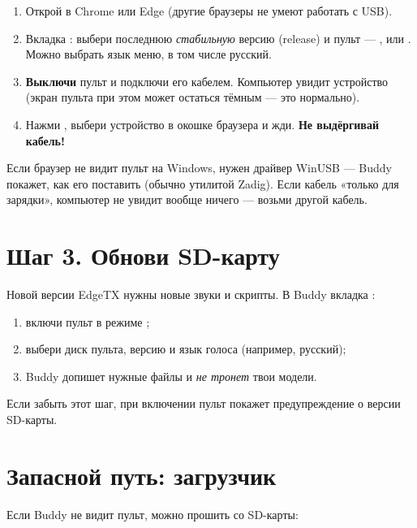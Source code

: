 \begin{enumerate}
  \item Открой  в Chrome или Edge (другие браузеры не умеют работать с USB).
  \item Вкладка : выбери последнюю \emph{стабильную} версию (release) и пульт ---
        ,  или .
        Можно выбрать язык меню, в том числе русский.
  \item \textbf{Выключи} пульт и подключи его кабелем. Компьютер увидит устройство
         (экран пульта при этом может остаться тёмным --- это нормально).
  \item Нажми , выбери устройство в окошке браузера и жди. \textbf{Не выдёргивай кабель!}
\end{enumerate}

\begin{tip}
Если браузер не видит пульт на Windows, нужен драйвер WinUSB --- Buddy покажет, как его
поставить (обычно утилитой Zadig). Если кабель «только для зарядки», компьютер не увидит
вообще ничего --- возьми другой кабель.
\end{tip}

\section{Шаг 3. Обнови SD-карту}

Новой версии EdgeTX нужны новые звуки и скрипты. В Buddy вкладка :
\begin{enumerate}
  \item включи пульт в режиме ;
  \item выбери диск пульта, версию и язык голоса (например, русский);
  \item Buddy допишет нужные файлы и \emph{не тронет} твои модели.
\end{enumerate}

Если забыть этот шаг, при включении пульт покажет предупреждение о версии SD-карты.

\section{Запасной путь: загрузчик}

Если Buddy не видит пульт, можно прошить со SD-карты:

